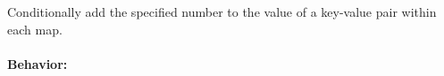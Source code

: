 Conditionally add the specified number to the value of a key-value pair within
each map.

\paragraph{Behavior:}
\begin{itemize}[noitemsep]



\end{itemize}
